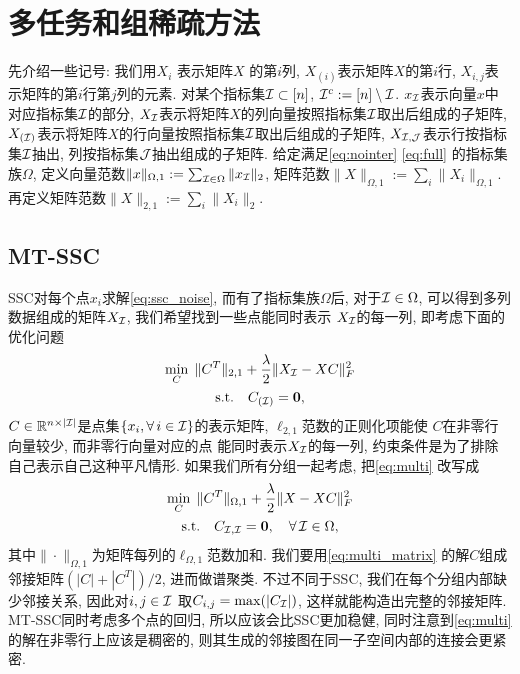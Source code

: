 \section{多任务和组稀疏方法}
先介绍一些记号: 我们用\(X_i\) 表示矩阵\(X\) 的第\(i\)列,
\(X_{(i)}\)表示矩阵\(X\)的第\(i\)行,
\(X_{i,j}\)表示矩阵的第\(i\)行第\(j\)列的元素.
对某个指标集\(\mathcal{I}\subset [n]\), \(\mathcal{I}^c:=[n]\setminus \mathcal{I}\).
\(x_{\mathcal{I}}\)表示向量\(x\)中对应指标集\(\mathcal{I}\)的部分,
\(X_{\mathcal{I}}\)表示将矩阵\(X\)的列向量按照指标集\(\mathcal{I}\)取出后组成的子矩阵, 
\(X_{(\mathcal{I})}\)表示将矩阵\(X\)的行向量按照指标集\(\mathcal{I}\)取出后组成的子矩阵,
\(X_{\mathcal{I}, \mathcal{J}}\)表示行按指标集\(\mathcal{I}\)抽出, 列按指标集\(\mathcal{J}\)抽出组成的子矩阵. 
给定满足\eqref{eq:nointer} \eqref{eq:full} 的指标集族\(\Omega\),
定义向量范数\(\|x\|_{\Omega, 1}:=\sum_{\mathcal{I} \in \Omega} \|x_{\mathcal{I}}\|_2\),
矩阵范数\(\|X\|_{\Omega, 1}:=\sum_{i} \|X_i\|_{\Omega, 1}\).
再定义矩阵范数\(\|X\|_{2, 1}:=\sum_{i} \|X_i\|_2\).

\subsection{MT-SSC}

SSC对每个点\(x_i\)求解\eqref{eq:ssc_noise}, 
而有了指标集族\(\Omega\)后, 对于\(\mathcal{I}\in \Omega\),
可以得到多列数据组成的矩阵\(X_{\mathcal{I}}\), 我们希望找到一些点能同时表示
\(X_{\mathcal{I}}\)的每一列, 即考虑下面的优化问题
\begin{equation}\label{eq:multi}
  \begin{gathered}
    \min_{C}\; \|C^T\|_{2, 1} + \frac{\lambda}{2} \|X_{\mathcal{I}} - XC\|_F^2\\
    \text{s.t.} \quad C_{(\mathcal{I})} = \mathbf{0},
  \end{gathered}
\end{equation}
\(C \in \mathbb{R}^{n \times |\mathcal{I}|}\)是点集\(\{x_i, \forall\, i\in \mathcal{I}\}\)的表示矩阵,
\(\ell_{2,1}\)范数的正则化项能使 \(C\)在非零行向量较少, 而非零行向量对应的点
能同时表示\(X_{\mathcal{I}}\)的每一列, 约束条件是为了排除自己表示自己这种平凡情形.
如果我们所有分组一起考虑, 把\eqref{eq:multi} 改写成
\begin{equation}\label{eq:multi_matrix}
  \begin{gathered}
    \min_C\; \|C^T\|_{\Omega, 1} + \frac{\lambda}{2} \|X-XC\|_F^2 \\
    \text{s.t.} \quad C_{\mathcal{I}, \mathcal{I}} = \mathbf{0}, \quad \forall \, \mathcal{I} \in
    \Omega,
  \end{gathered}
\end{equation}
其中\(\|\cdot\|_{\Omega, 1}\)为矩阵每列的\(\ell_{\Omega, 1}\)范数加和.
我们要用\eqref{eq:multi_matrix} 的解\(C\)组成邻接矩阵\((|C|+|C^T|)/2\),
进而做谱聚类. 不过不同于SSC, 我们在每个分组内部缺少邻接关系,
因此对\(i, j\in\mathcal{I}\) 取\(C_{i, j} = \max(|C_{\mathcal{I}}|)\), 这样就能构造出完整的邻接矩阵.
MT-SSC同时考虑多个点的回归, 所以应该会比SSC更加稳健, 同时注意到\eqref{eq:multi} 
的解在非零行上应该是稠密的, 则其生成的邻接图在同一子空间内部的连接会更紧密.

